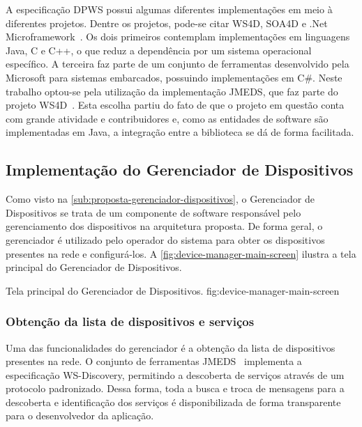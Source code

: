 A especificação \gls{DPWS} possui algumas diferentes implementações em meio à diferentes projetos.
Dentre os projetos, pode-se citar WS4D, SOA4D e .Net Microframework~\cite{marcelo2013analise}. Os
dois primeiros contemplam implementações em linguagens Java, C e C++, o que reduz a dependência por
um sistema operacional específico. A terceira faz parte de um conjunto de ferramentas desenvolvido
pela Microsoft para sistemas embarcados, possuindo implementações em C\#. Neste trabalho optou-se
pela utilização da implementação \gls{JMEDS}, que faz parte do projeto
WS4D~\cite{jmeds2013homepage}. Esta escolha partiu do fato de que o projeto em questão conta com
grande atividade e contribuidores e, como as entidades de software são implementadas em Java, a
integração entre a biblioteca se dá de forma facilitada.


\subsection{Implementação do Gerenciador de Dispositivos}

Como visto na \cref{sub:proposta-gerenciador-dispositivos}, o Gerenciador de Dispositivos se trata
de um componente de software responsável pelo gerenciamento dos dispositivos na arquitetura
proposta. De forma geral, o gerenciador é utilizado pelo operador do sistema para obter os
dispositivos presentes na rede e configurá-los. A \cref{fig:device-manager-main-screen} ilustra a
tela principal do Gerenciador de Dispositivos.

  {Tela principal do Gerenciador de Dispositivos.}
  {fig:device-manager-main-screen}


\subsubsection{Obtenção da lista de dispositivos e serviços}

Uma das funcionalidades do gerenciador é a obtenção da lista de dispositivos presentes na rede. O
conjunto de ferramentas \gls{JMEDS}~\cite{jmeds2013homepage} implementa a especificação
{WS-Discovery}, permitindo a descoberta de serviços através de um protocolo padronizado. Dessa forma,
toda a busca e troca de mensagens para a descoberta e identificação dos serviços é disponibilizada
de forma transparente para o desenvolvedor da aplicação.


